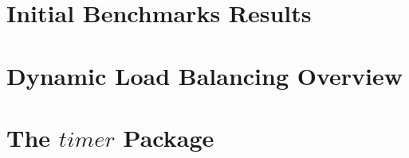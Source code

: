 \appendix
\section{Initial Benchmarks Results} 
\section{Dynamic Load Balancing Overview} 
\section{The $timer$ Package} 